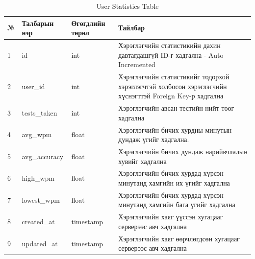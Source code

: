 \begin{table}[h]
	\caption{User Statistics Table}
	\begin{tabular}{|l|l|l|p{8cm}|}
		\hline
		№ & Талбарын нэр  & Өгөгдлийн төрөл & Тайлбар                                                                                                 \\ \hline
		1 & id            & int             & Хэрэглэгчийн статистикийн дахин давтагдашгүй ID-г хадгална - Auto Incremented                           \\ \hline
		2 & user\_id      & int             & Хэрэглэгчийн статистикийг тодорхой хэрэглэгчтэй холбосон хэрэглэгчийн хүснэгттэй Foreign Key-р хадгална \\ \hline
		3 & tests\_taken  & int             & Хэрэглэгчийн авсан тестийн нийт тоог хадгална                                                           \\ \hline
		4 & avg\_wpm      & float           & Хэрэглэгчийн бичих хурдны минутын дундаж үгийг хадгална.                                                \\ \hline
		5 & avg\_accuracy & float           & Хэрэглэгчийн бичих дундаж нарийвчлалын хувийг хадгална                                                  \\ \hline
		6 & high\_wpm     & float           & Хэрэглэгчийн бичих хурдад хүрсэн минутанд хамгийн их үгийг хадгална                                     \\ \hline
		7 & lowest\_wpm   & float           & Хэрэглэгчийн бичих хурдад хүрсэн минутанд хамгийн бага үгийг хадгална                                   \\ \hline
		8 & created\_at   & timestamp       & Хэрэглэгчийн хаяг үүссэн хугацааг серверээс авч хадгална                                                \\ \hline
		9 & updated\_at   & timestamp       & Хэрэглэгчийн хаяг өөрчлөгдсөн хугацааг серверээс авч хадгална                                           \\ \hline
	\end{tabular}
\end{table}

